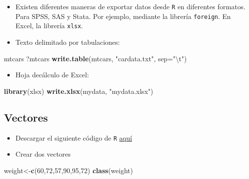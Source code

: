\documentclass[]{article}
\def\tightlist{}
\newenvironment{Shaded}{\begin{snugshade}}{\end{snugshade}}
\newcommand{\KeywordTok}[1]{\textcolor[rgb]{0.13,0.29,0.53}{\textbf{{#1}}}}
\newcommand{\DataTypeTok}[1]{\textcolor[rgb]{0.13,0.29,0.53}{{#1}}}
\newcommand{\DecValTok}[1]{\textcolor[rgb]{0.00,0.00,0.81}{{#1}}}
\newcommand{\CharTok}[1]{\textcolor[rgb]{0.31,0.60,0.02}{{#1}}}
\newcommand{\StringTok}[1]{\textcolor[rgb]{0.31,0.60,0.02}{{#1}}}
\newcommand{\NormalTok}[1]{{#1}}
\numberwithin{equation}{section}
\begin{document}
\begin{itemize}
\item
  Existen diferentes maneras de exportar datos desde \texttt{R} en
  diferentes formatos. Para SPSS, SAS y Stata. Por ejemplo, mediante la
  librería \texttt{foreign}. En Excel, la librería \texttt{xlsx}.
\item
  Texto delimitado por tabulaciones:
\end{itemize}

\begin{Shaded}
\begin{Highlighting}[]
\NormalTok{mtcars}
\NormalTok{?mtcars    }
\KeywordTok{write.table}\NormalTok{(mtcars, }\StringTok{"cardata.txt"}\NormalTok{, }\DataTypeTok{sep=}\StringTok{"}\CharTok{\textbackslash{}t}\StringTok{"}\NormalTok{) }
\end{Highlighting}
\end{Shaded}

\begin{itemize}
\tightlist
\item
  Hoja decálculo de Excel:
\end{itemize}

\begin{Shaded}
\begin{Highlighting}[]
\KeywordTok{library}\NormalTok{(xlsx)}
\KeywordTok{write.xlsx}\NormalTok{(mydata, }\StringTok{"mydata.xlsx"}\NormalTok{)}
\end{Highlighting}
\end{Shaded}

\subsection{Vectores}\label{vectores}

\begin{itemize}
\item
  Descargar el siguiente código de \texttt{R}
  \href{http://idaejin.github.io/bcam-courses/rbasics/rbasics.R}{aquí}
\item
  Crear dos vectores
\end{itemize}

\begin{Shaded}
\begin{Highlighting}[]
\NormalTok{weight<-}\KeywordTok{c}\NormalTok{(}\DecValTok{60}\NormalTok{,}\DecValTok{72}\NormalTok{,}\DecValTok{57}\NormalTok{,}\DecValTok{90}\NormalTok{,}\DecValTok{95}\NormalTok{,}\DecValTok{72}\NormalTok{)  }
\KeywordTok{class}\NormalTok{(weight)}
\end{Highlighting}
\end{Shaded}
\end{document}
